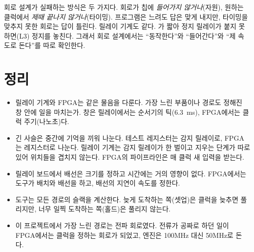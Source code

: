 \begin{keybox}[title={회로 설계의 두 가지 실패}]
회로 설계가 실패하는 방식은 두 가지다. 회로가 칩에 \emph{들어가지 않거나}(자원), 원하는 클럭에서
\emph{제때 끝나지 않거나}(타이밍). 프로그램은 느려도 답은 맞게 내지만, 타이밍을 맞추지 못한 회로는 답이
틀린다. 릴레이 기계도 같다. 가 짧아 정지 릴레이가 붙지 못하면(L3) 정지를 놓친다. 그래서 회로
설계에서는 ``동작한다''와 ``들어간다''와 ``제 속도로 돈다''를 따로 확인한다.
\end{keybox}

\section{정리}

\begin{itemize}
\item 릴레이 기계와 FPGA는 같은 물음을 다룬다. 가장 느린 부품이나 경로도 정해진 창 안에 일을 마치는가. 창은
릴레이에서는 순서기의 틱(6.3~ms), FPGA에서는 클럭 주기(나노초)다.
\item 긴 사슬은 중간에 기억을 끼워 나눈다. 테스트 레지스터는 감지 릴레이로, FPGA는 레지스터로 나눈다.
릴레이 기계는 감지 릴레이가 한 벌이고 지우는 단계가 따로 있어 위치들을 겹치지 않는다. FPGA의 파이프라인은
매 클럭 새 입력을 받는다.
\item 릴레이 보드에서 배선은 크기를 정하고 시간에는 거의 영향이 없다. FPGA에서는 도구가 배치와 배선을 하고,
배선의 지연이 속도를 정한다.
\item 도구는 모든 경로의 슬랙을 계산한다. 늦게 도착하는 쪽(셋업)은 클럭을 늦추면 풀리지만, 너무 일찍
도착하는 쪽(홀드)은 풀리지 않는다.
\item 이 프로젝트에서 가장 느린 경로는 전파 회로였다. 전류가 공짜로 하던 일이 FPGA에서는 클럭을 정하는
회로가 되었고, 엔진은 100MHz 대신 50MHz로 돈다.
\end{itemize}
